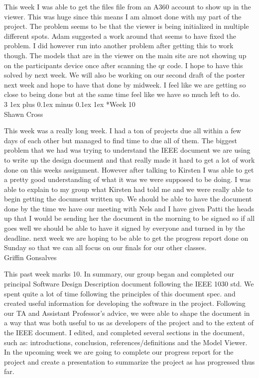 \documentclass[letterpaper, 10pt, draftclsnofoot, compsoc, onecolumn]{IEEEtran}
\makeatletter
\def\subsubsection{\@startsection{subsubsection}%
                                 {3}%
                                 {\z@}%
                                 {1ex plus 0.1ex minus 0.1ex}%
                                 {1ex}%
                                 {\normalfont\normalsize}}%
\makeatother
\begin{document}
This week I was able to get the files file from an A360 account to show up in the viewer. This was huge since this means I am almost done with my part of the project. The problem seems to be that the viewer is being initialized in multiple different spots. Adam suggested a work around that seems to have fixed the problem. I did however run into another problem after getting this to work though. The models that are in the viewer on the main site are not showing up on the participants device once after scanning the qr code. I hope to have this solved by next week. We will also be working on our second draft of the poster next week and hope to have that done by midweek. I feel like we are getting so close to being done but at the same time feel like we have so much left to do.\\

\subsubsection*{Week 10}\hspace*{\fill} \\
Shawn Cross

This week was a really long week. I had a ton of projects due all within a few days of each other but managed to find time to due all of them. The biggest problem that we had was trying to understand the IEEE document we are using to write up the design document and that really made it hard to get a lot of work done on this weeks assignment. However after talking to Kirsten I was able to get a pretty good understanding of what it was we were supposed to be doing. I was able to explain to my group what Kirsten had told me and we were really able to begin getting the document written up. We should be able to have the document done by the time we have our meeting with Nels and I have given Patti the heads up that I would be sending her the document in the morning to be signed so if all goes well we should be able to have it signed by everyone and turned in by the deadline. next week we are hoping to be able to get the progress report done on Sunday so that we can all focus on our finals for our other classes.\\

Griffin Gonsalves

This past week marks 10. In summary, our group began and completed our principal Software Design Description document following the IEEE 1030 std. We spent quite a lot of time following the principles of this document spec. and created useful information for developing the software in the project. Following our TA and Assistant Professor's advice, we were able to shape the document in a way that was both useful to us as developers of the project and to the extent of the IEEE document. I edited, and completed several sections in the document, such as: introductions, conclusion, references/definitions and the Model Viewer. In the upcoming week we are going to complete our progress report for the project and create a presentation to summarize the project as has progressed thus far.
\end{document}

